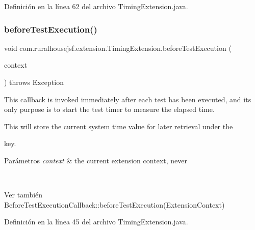 Definición en la línea 62 del archivo Timing\+Extension.\+java.

\mbox{\label{a00268_ad19d0a2513bd9041f9263c1d9536ed6c}} 
\subsubsection{\texorpdfstring{beforeTestExecution()}{beforeTestExecution()}}
{\footnotesize\ttfamily void com.\+ruralhousejsf.\+extension.\+Timing\+Extension.\+before\+Test\+Execution (\begin{DoxyParamCaption}\item[{Extension\+Context}]{context }\end{DoxyParamCaption}) throws Exception}



This callback is invoked {\ttfamily immediately after} each test has been executed, and its only purpose is to start the test timer to measure the elapsed time. 

This will store the current system time value for later retrieval under the
\begin{DoxyCode}{0}
\end{DoxyCode}
 key.


\begin{DoxyParams}{Parámetros}
{\em context} & the current extension context, never
\begin{DoxyCode}{1}
\DoxyCodeLine{\textcolor{keyword}{null} }
\end{DoxyCode}
\\
\hline
\end{DoxyParams}
\begin{DoxySeeAlso}{Ver también}
Before\+Test\+Execution\+Callback\+::before\+Test\+Execution(\+Extension\+Context) 
\end{DoxySeeAlso}


Definición en la línea 45 del archivo Timing\+Extension.\+java.

\mbox{\label{a00268_a489c3097fd687a25391189f3fec56fa8}} 
